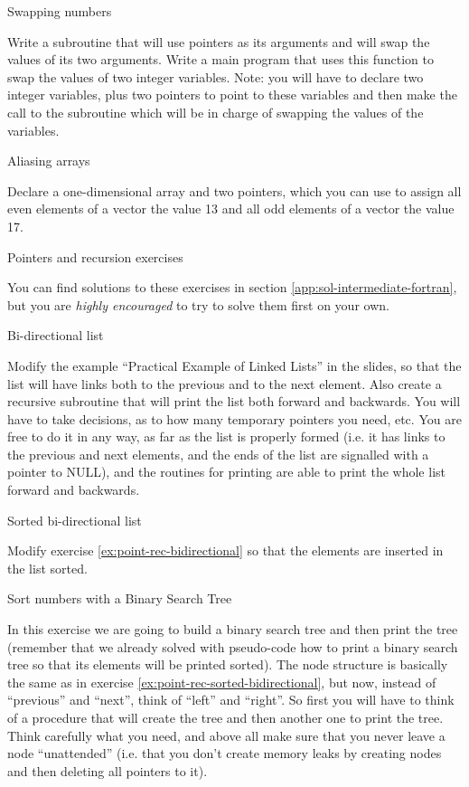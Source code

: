  {Swapping numbers}
\label{ex:pointer-swap}

Write a subroutine that will use pointers as its arguments and will swap the
values of its two arguments. Write a main program that uses this function to
swap the values of two integer variables. Note: you will have to declare two
integer variables, plus two pointers to point to these variables and then make
the call to the subroutine which will be in charge of swapping the values of the
variables.


 {Aliasing arrays}
\label{ex:pointer-alias-arrays}

Declare a one-dimensional array and two pointers, which you can use to assign
all even elements of a vector the value 13 and all odd elements of a vector the
value 17.  



 {Pointers and recursion exercises}
\label{sec:pointers-recursion-exercises}

You can find solutions to these exercises in section
\ref{app:sol-intermediate-fortran}, but you are \emph{highly encouraged} to try
to solve them first on your own.


 {Bi-directional list}
\label{ex:point-rec-bidirectional}

Modify the example ``Practical Example of Linked Lists'' in the slides, so that
the list will have links both to the previous and to the next element. Also
create a recursive subroutine that will print the list both forward and
backwards. You will have to take decisions, as to how many temporary pointers
you need, etc. You are free to do it in any way, as far as the list is properly
formed (i.e. it has links to the previous and next elements, and the ends of the
list are signalled with a pointer to NULL), and the routines for printing are
able to print the whole list forward and backwards.

 {Sorted bi-directional list}
\label{ex:point-rec-sorted-bidirectional}

Modify exercise \ref{ex:point-rec-bidirectional} so that the elements are
inserted in the list sorted.

 {Sort numbers with a Binary Search Tree}
\label{ex:point-rec-bst}

In this exercise we are going to build a binary search tree and then print the
tree (remember that we already solved with pseudo-code how to print a binary
search tree so that its elements will be printed sorted). The node structure is
basically the same as in exercise \ref{ex:point-rec-sorted-bidirectional}, but
now, instead of ``previous'' and ``next'', think of ``left'' and ``right''. So
first you will have to think of a procedure that will create the tree and then
another one to print the tree. Think carefully what you need, and above all make
sure that you never leave a node ``unattended'' (i.e. that you don't create
memory leaks by creating nodes and then deleting all pointers to it).

